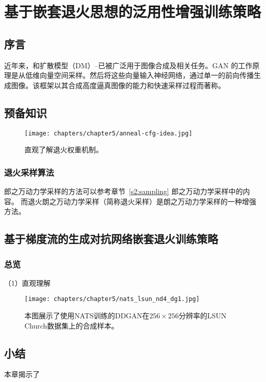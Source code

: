 \chapter{基于嵌套退火思想的泛用性增强训练策略}
\label{chapters/chapter5/}


\section{序言}
近年来，\cite{goodfellow2014generative}和扩散模型（DM）--已被广泛用于图像合成及相关任务。GAN 的工作原理是从低维向量空间采样。然后将这些向量输入神经网络，通过单一的前向传播生成图像。该框架以其合成高度逼真图像的能力和快速采样过程而著称。

\section{预备知识}

%
\begin{figure}[tp]
\centering 
\texttt{[image: chapters/chapter5/anneal-cfg-idea.jpg]}
\caption{
直观了解退火权重机制。
\label{Fig.Intuitive}}
\vspace{-0.2in}
\end{figure}

\subsection{退火采样算法}
郎之万动力学采样的方法可以参考章节~\ref{s2:sampling} 郎之万动力学采样中的内容。
而退火朗之万动力学采样（简称退火采样）是朗之万动力学采样的一种增强方法。

\section{
基于梯度流的生成对抗网络嵌套退火训练策略}
\subsection{总览}\label{overview}
{\heiti（1）直观理解}

%
\begin{figure*}[!htb]
\centering 
\texttt{[image: chapters/chapter5/nats\_lsun\_nd4\_dg1.jpg]}
\caption{本图展示了使用NATS训练的DDGAN在$256\times256$分辨率的LSUN Church数据集上的合成样本。
\label{Fig.nats_lsun256_nd4_1}}
\vspace{-0.2in}
\end{figure*}



\section{小结}
本章揭示了